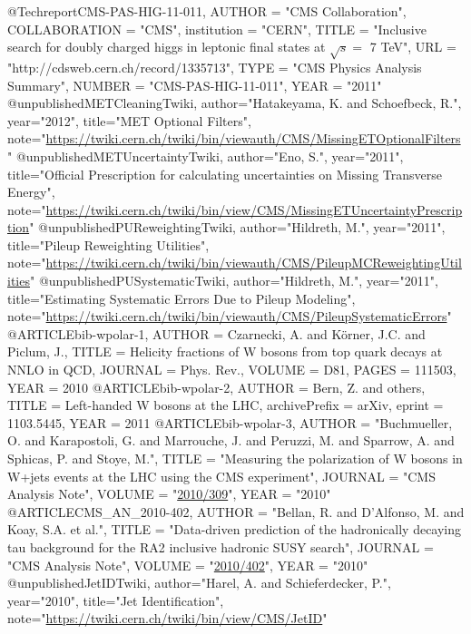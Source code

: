 @Techreport{CMS-PAS-HIG-11-011,
      AUTHOR      = "{CMS Collaboration}",
      COLLABORATION = "{CMS}",
      institution    = "CERN",
      TITLE       = "Inclusive search for doubly charged higgs in leptonic final states at $\sqrt{s} =$ 7 TeV",
      URL         = "http://cdsweb.cern.ch/record/1335713",
      TYPE        = "CMS Physics Analysis Summary",
      NUMBER      = "CMS-PAS-HIG-11-011",
      YEAR        = "2011"
}
@unpublished{METCleaningTwiki,
author="{Hatakeyama, K. and Schoefbeck, R.}",
year="2012",
title="MET Optional Filters",
note="\url{https://twiki.cern.ch/twiki/bin/viewauth/CMS/MissingETOptionalFilters}"
}
@unpublished{METUncertaintyTwiki,
author="{Eno, S.}",
year="2011",
title="Official Prescription for calculating uncertainties on Missing Transverse Energy",
note="\url{https://twiki.cern.ch/twiki/bin/view/CMS/MissingETUncertaintyPrescription}"
}
@unpublished{PUReweightingTwiki,
author="{Hildreth, M.}",
year="2011",
title="Pileup Reweighting Utilities",
note="\url{https://twiki.cern.ch/twiki/bin/viewauth/CMS/PileupMCReweightingUtilities}"
}
@unpublished{PUSystematicTwiki,
author="{Hildreth, M.}",
year="2011",
title="Estimating Systematic Errors Due to Pileup Modeling",
note="\url{https://twiki.cern.ch/twiki/bin/viewauth/CMS/PileupSystematicErrors}"
}
@ARTICLE{bib-wpolar-1,
  AUTHOR         = {Czarnecki, A. and K\"{o}rner, J.C. and Piclum, J.},
  TITLE          = {Helicity fractions of W bosons from top quark decays at NNLO in QCD},
  JOURNAL        = {Phys. Rev.},
  VOLUME         = {D81},
  PAGES          = {111503},
  YEAR           = {2010}
}
@ARTICLE{bib-wpolar-2,
  AUTHOR         = {Bern, Z. and others},
  TITLE          = {Left-handed W bosons at the LHC},
  archivePrefix  = {arXiv},
  eprint         = {1103.5445},
  YEAR           = {2011}
}
@ARTICLE{bib-wpolar-3,
     AUTHOR       = "Buchmueller, O. and Karapostoli, G. and Marrouche, J. and Peruzzi, M. and Sparrow, A. and Sphicas, P. and Stoye, M.",
     TITLE        = "Measuring the polarization of W bosons in W+jets events at the LHC using the CMS experiment",
     JOURNAL      = "CMS Analysis Note",
     VOLUME       = "\href{http://cms.cern.ch/iCMS/jsp/db_notes/noteInfo.jsp?cmsnoteid=CMS\%20AN-2010/309}{2010/309}",
      YEAR         = "2010"
}
@ARTICLE{CMS_AN_2010-402,
     AUTHOR       = "Bellan, R. and D'Alfonso, M. and Koay, S.A. et al.",
     TITLE        = "Data-driven prediction of the hadronically decaying tau background for the RA2 inclusive hadronic SUSY search",
     JOURNAL      = "CMS Analysis Note",
     VOLUME       = "\href{http://cms.cern.ch/iCMS/jsp/db_notes/noteInfo.jsp?cmsnoteid=CMS\%20AN-2010/402}{2010/402}",
     YEAR         = "2010"
}
@unpublished{JetIDTwiki,
author="{Harel, A. and Schieferdecker, P.}",
year="2010",
title="Jet Identification",
note="\url{https://twiki.cern.ch/twiki/bin/view/CMS/JetID}"
}

